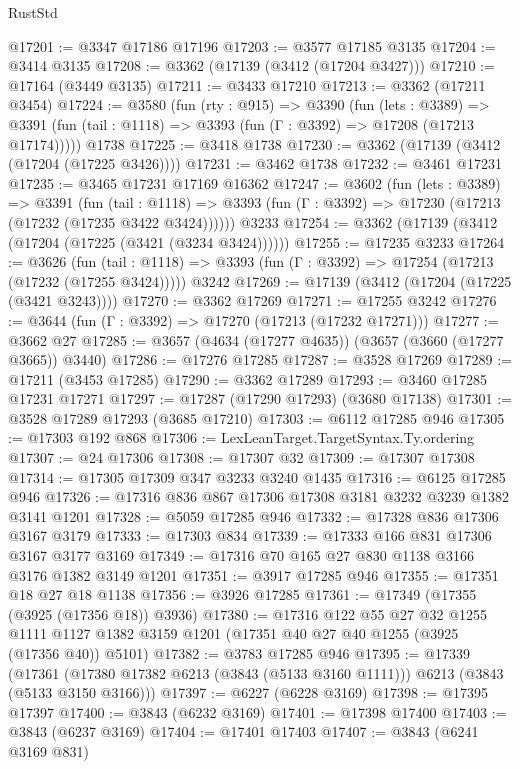 \begin{lexlean}{RustStd}
\begin{coremodule}
@17201 := @3347 @17186 @17196
@17203 := @3577 @17185 @3135
@17204 := @3414 @3135
@17208 := @3362 (@17139 (@3412 (@17204 @3427)))
@17210 := @17164 (@3449 @3135)
@17211 := @3433 @17210
@17213 := @3362 (@17211 @3454)
@17224 := @3580
    (fun (rty : @915) =>
    @3390
      (fun (lets : @3389) =>
      @3391 (fun (tail : @1118) => @3393 (fun (Γ : @3392) => @17208 (@17213 @17174)))))
    @1738
@17225 := @3418 @1738
@17230 := @3362 (@17139 (@3412 (@17204 (@17225 @3426))))
@17231 := @3462 @1738
@17232 := @3461 @17231
@17235 := @3465 @17231 @17169 @16362
@17247 := @3602
    (fun (lets : @3389) =>
    @3391
      (fun (tail : @1118) =>
      @3393 (fun (Γ : @3392) => @17230 (@17213 (@17232 (@17235 @3422 @3424))))))
    @3233
@17254 := @3362 (@17139 (@3412 (@17204 (@17225 (@3421 (@3234 @3424))))))
@17255 := @17235 @3233
@17264 := @3626
    (fun (tail : @1118) => @3393 (fun (Γ : @3392) => @17254 (@17213 (@17232 (@17255 @3424)))))
    @3242
@17269 := @17139 (@3412 (@17204 (@17225 (@3421 @3243))))
@17270 := @3362 @17269
@17271 := @17255 @3242
@17276 := @3644 (fun (Γ : @3392) => @17270 (@17213 (@17232 @17271)))
@17277 := @3662 @27
@17285 := @3657 (@4634 (@17277 @4635)) (@3657 (@3660 (@17277 @3665)) @3440)
@17286 := @17276 @17285
@17287 := @3528 @17269
@17289 := @17211 (@3453 @17285)
@17290 := @3362 @17289
@17293 := @3460 @17285 @17231 @17271
@17297 := @17287 (@17290 @17293) (@3680 @17138)
@17301 := @3528 @17289 @17293 (@3685 @17210)
@17303 := @6112 @17285 @946
@17305 := @17303 @192 @868
@17306 := LexLeanTarget.TargetSyntax.Ty.ordering
@17307 := @24 @17306
@17308 := @17307 @32
@17309 := @17307 @17308
@17314 := @17305 @17309 @347 @3233 @3240 @1435
@17316 := @6125 @17285 @946
@17326 := @17316 @836 @867 @17306 @17308 @3181 @3232 @3239 @1382 @3141 @1201
@17328 := @5059 @17285 @946
@17332 := @17328 @836 @17306 @3167 @3179
@17333 := @17303 @834
@17339 := @17333 @166 @831 @17306 @3167 @3177 @3169
@17349 := @17316 @70 @165 @27 @830 @1138 @3166 @3176 @1382 @3149 @1201
@17351 := @3917 @17285 @946
@17355 := @17351 @18 @27 @18 @1138
@17356 := @3926 @17285
@17361 := @17349 (@17355 (@3925 (@17356 @18)) @3936)
@17380 := @17316
    @122
    @55
    @27
    @32
    @1255
    @1111
    @1127
    @1382
    @3159
    @1201
    (@17351 @40 @27 @40 @1255 (@3925 (@17356 @40)) @5101)
@17382 := @3783 @17285 @946
@17395 := @17339
    (@17361 (@17380 @17382 @6213 (@3843 (@5133 @3160 @1111))) @6213 (@3843 (@5133 @3150 @3166)))
@17397 := @6227 (@6228 @3169)
@17398 := @17395 @17397
@17400 := @3843 (@6232 @3169)
@17401 := @17398 @17400
@17403 := @3843 (@6237 @3169)
@17404 := @17401 @17403
@17407 := @3843 (@6241 @3169 @831)

\end{coremodule}
\end{lexlean}
